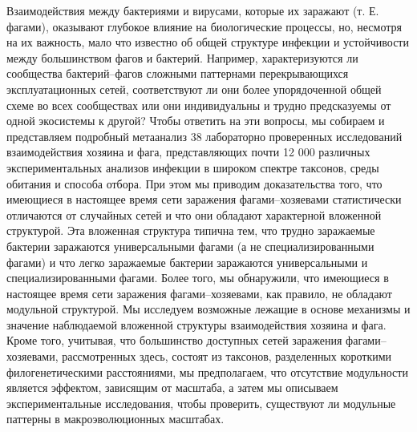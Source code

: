 \documentclass[a4paper,12pt]{article}
\begin{document}
    \par{Взаимодействия между бактериями и вирусами, которые их заражают (т. Е. фагами), оказывают глубокое влияние на
    биологические процессы, но, несмотря на их важность, мало что известно об общей структуре инфекции и устойчивости
    между большинством фагов и бактерий. Например, характеризуются ли сообщества бактерий–фагов сложными паттернами
    перекрывающихся эксплуатационных сетей, соответствуют ли они более упорядоченной общей схеме во всех сообществах
    или они индивидуальны и трудно предсказуемы от одной экосистемы к другой? Чтобы ответить на эти вопросы, мы
    собираем и представляем подробный метаанализ 38 лабораторно проверенных исследований взаимодействия хозяина и фага,
    представляющих почти 12 000 различных экспериментальных анализов инфекции в широком спектре таксонов, среды
    обитания и способа отбора. При этом мы приводим доказательства того, что имеющиеся в настоящее время сети заражения
    фагами–хозяевами статистически отличаются от случайных сетей и что они обладают характерной вложенной структурой.
    Эта вложенная структура типична тем, что трудно заражаемые бактерии заражаются универсальными фагами (а не
    специализированными фагами) и что легко заражаемые бактерии заражаются универсальными и специализированными фагами.
    Более того, мы обнаружили, что имеющиеся в настоящее время сети заражения фагами–хозяевами, как правило, не
    обладают модульной структурой. Мы исследуем возможные лежащие в основе механизмы и значение наблюдаемой вложенной
    структуры взаимодействия хозяина и фага. Кроме того, учитывая, что большинство доступных сетей заражения
    фагами–хозяевами, рассмотренных здесь, состоят из таксонов, разделенных короткими филогенетическими расстояниями,
    мы предполагаем, что отсутствие модульности является эффектом, зависящим от масштаба, а затем мы описываем
    экспериментальные исследования, чтобы проверить, существуют ли модульные паттерны в макроэволюционных масштабах.}
    
\end{document}
